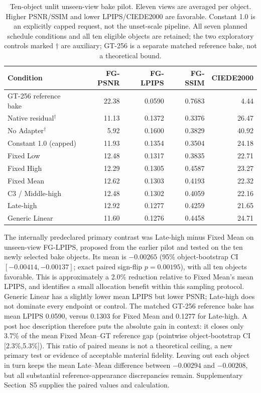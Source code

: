 \documentclass[times,twocolumn,final]{elsarticle}
\begin{document}
\begin{table}[ht]
\centering\scriptsize
\caption{Ten-object unlit unseen-view bake pilot. Eleven views are averaged per object. Higher PSNR/SSIM and lower LPIPS/CIEDE2000 are favorable. Constant 1.0 is an explicitly capped request, not the unset-scale pipeline. All seven planned schedule conditions and all ten eligible objects are retained; the two exploratory controls marked $\dagger$ are auxiliary; GT-256 is a separate matched reference bake, not a theoretical bound.}
\label{tab:new-bake}
\begin{tabular}{lrrrr}
\toprule Condition & FG-PSNR & FG-LPIPS & FG-SSIM & CIEDE2000 \\
\midrule
GT-256 reference bake & 22.38 & 0.0590 & 0.7683 & 4.44 \\
\midrule
Native residual$^\dagger$ & 11.13 & 0.1372 & 0.3376 & 26.47 \\
No Adapter$^\dagger$ & 5.92 & 0.1600 & 0.3829 & 40.92 \\
Constant 1.0 (capped) & 11.93 & 0.1354 & 0.3504 & 24.18 \\
Fixed Low & 12.48 & 0.1317 & 0.3835 & 22.71 \\
Fixed High & 12.29 & 0.1305 & 0.4587 & 23.27 \\
Fixed Mean & 12.62 & 0.1303 & 0.4193 & 22.32 \\
C3 / Middle-high & 12.48 & 0.1302 & 0.4059 & 22.16 \\
Late-high & 12.92 & 0.1277 & 0.4259 & 21.65 \\
Generic Linear & 11.60 & 0.1276 & 0.4458 & 24.71 \\
\bottomrule\end{tabular}
\end{table}

The internally predeclared primary contrast was Late-high minus Fixed Mean on unseen-view FG-LPIPS, proposed from the earlier pilot and tested on the ten newly selected bake objects. Its mean is $-0.00265$ (95\% object-bootstrap CI $[-0.00414,-0.00137]$; exact paired sign-flip $p=0.00195$), with all ten objects favorable. This is approximately a 2.0\% reduction relative to Fixed Mean's mean LPIPS, and identifies a small allocation benefit within this sampling protocol. Generic Linear has a slightly lower mean LPIPS but lower PSNR; Late-high does not dominate every endpoint or control. The matched GT-256 reference bake has mean LPIPS 0.0590, versus 0.1303 for Fixed Mean and 0.1277 for Late-high. A post hoc description therefore puts the absolute gain in context: it closes only 3.7\% of the mean Fixed Mean--GT reference gap (pointwise object-bootstrap CI [2.3\%,5.3\%]). This ratio of paired means is not a theoretical ceiling, a new primary test or evidence of acceptable material fidelity. Leaving out each object in turn keeps the mean Late--Mean difference between $-0.00294$ and $-0.00208$, but all substantial reference-appearance discrepancies remain. Supplementary Section~S5 supplies the paired values and calculation.
\end{document}
